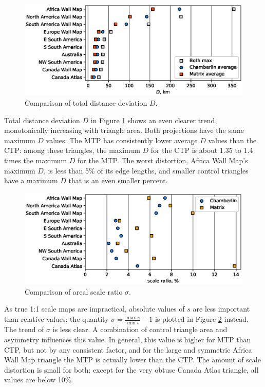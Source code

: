 \documentclass[]{interact}
\begin{document}
\begin{figure}
  \includegraphics[width=\textwidth]{distanceplot}
  \caption{Comparison of total distance deviation $D$.}
  \label{fig:distancep}
\end{figure}

Total distance deviation $D$ in Figure \ref{fig:distancep} shows an even clearer
trend, monotonically increasing with triangle area. Both projections have the
same maximum $D$ values. The MTP has consistently lower average $D$ values than
the CTP: among these triangles, the maximum $D$ for the CTP is about
1.35 to 1.4 times the maximum $D$ for the MTP. The worst distortion,
Africa Wall Map's maximum $D$, is less than 5\% of its edge lengths, and
smaller control triangles have a maximum $D$ that is an even smaller percent.

\begin{figure}
  \includegraphics[width=\textwidth]{scaleplot}
  \caption{Comparison of areal scale ratio $\sigma$.}
  \label{fig:scalep}
\end{figure}

As true 1:1 scale maps are impractical, absolute values of $s$ are less
important than relative values: the quantity
$\sigma = \frac{\max s}{\min s} - 1$ is plotted in Figure
\ref{fig:scalep} instead. The trend of $\sigma$ is less clear. A combination of
control triangle area and asymmetry influences this value. In general, this
value is higher for MTP than CTP, but not by any consistent factor,
and for the large and symmetric Africa Wall Map triangle the MTP is
actually lower than the CTP. The amount of scale distortion is small for both:
except for the very obtuse Canada Atlas triangle, all values are below 10\%.
\end{document}
